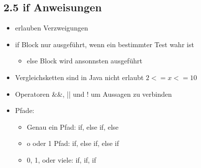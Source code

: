 \documentclass[11pt]{article}
\begin{document}
\subsection{2.5 if Anweisungen}
\label{sec:org58bc863}
\begin{itemize}
\item erlauben Verzweigungen\\
\item if Block nur ausgeführt, wenn ein bestimmter Test wahr ist\\
\begin{itemize}
\item else Block wird ansonnsten ausgeführt\\
\end{itemize}
\item Vergleichsketten sind in Java nicht erlaubt \sout{\(2 <= x <= 10\)}\\
\item Operatoren \&\&, || und ! um Aussagen zu verbinden\\
\item Pfade:\\
\begin{itemize}
\item Genau ein Pfad: if, else if, else\\
\item o oder 1 Pfad: if, else if, else if\\
\item 0, 1, oder viele: if, if, if\\
\end{itemize}
\end{itemize}
\end{document}
